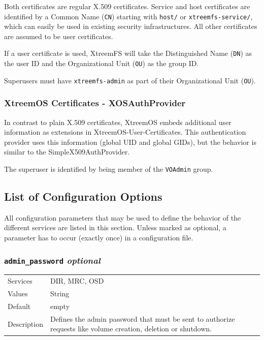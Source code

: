 \documentclass[a4paper,10pt]{book}
\begin{document}
Both certificates are regular X.509 certificates. Service and host certificates are identified by a Common Name (\texttt{CN}) starting with \texttt{host/} or \texttt{xtreemfs-service/}, which can easily be used in existing security infrastructures. All other certificates are assumed to be user certificates.

If a user certificate is used, XtreemFS will take the Distinguished Name (\texttt{DN}) as the user ID and the Organizational Unit (\texttt{OU}) as the group ID.

Superusers must have \texttt{xtreemfs-admin} as part of their Organizational Unit (\texttt{OU}).

\subsubsection{XtreemOS Certificates - XOSAuthProvider}

In contrast to plain X.509 certificates, XtreemOS embeds additional user information as extensions in XtreemOS-User-Certificates. This authentication provider uses this information (global UID and global GIDs), but the behavior is similar to the SimpleX509AuthProvider.

The superuser is identified by being member of the \texttt{VOAdmin} group.

\subsection{List of Configuration Options}
\label{sec:config}

All configuration parameters that may be used to define the behavior of the different services are listed in this section. Unless marked as optional, a parameter has to occur (exactly once) in a configuration file.


\subsubsection{\texttt{admin\_password} \textit{optional}}
\begin{tabular}{lp{10cm}}
 Services & DIR, MRC, OSD\\
 Values   & String \\
 Default  & empty\\
 Description & Defines the admin password that must be sent to authorize requests like volume creation, deletion or shutdown.
\end{tabular}
\end{document}
